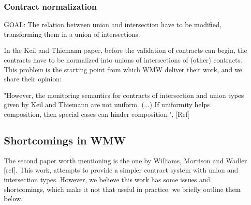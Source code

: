 





\subsubsection{Contract normalization}

GOAL: The relation between union and intersection have to be modified, transforming them
in a union of intersections.

In the Keil and Thiemann paper, before the validation of contracts can begin, the
contracts have to be normalized into unions of intersections of (other) contracts.
This problem  is the starting point from which
WMW deliver their work, and we share their opinion:

"However, the monitoring semantics for contracts of intersection and union types given by Keil
and Thiemann are not uniform. (...) If uniformity helps composition, then
special cases can hinder composition.", [Ref]

\subsection{Shortcomings in WMW}

The second paper worth mentioning is the one by Williams, Morrison and Wadler [ref].
This work, attempts to provide a simpler contract system with
union and intersection types.
However, we believe this work has some issues and shortcomings, which make it
not that useful in practice; we briefly outline them below.


